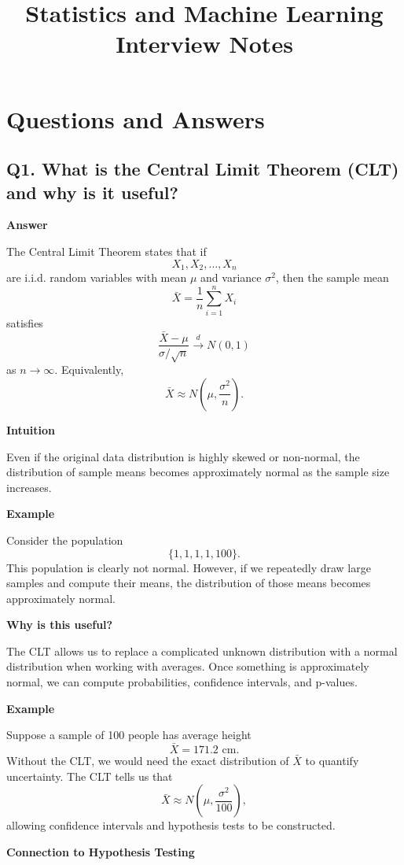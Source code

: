 \documentclass[11pt]{article}
\title{Statistics and Machine Learning Interview Notes}
\author{}
\date{}
\begin{document}
\maketitle

\section{Questions and Answers}

\subsection*{Q1. What is the Central Limit Theorem (CLT) and why is it useful?}

\textbf{Answer}

The Central Limit Theorem states that if
\[
X_1,X_2,\dots,X_n
\]
are i.i.d. random variables with mean $\mu$ and variance $\sigma^2$, then the sample mean
\[
\bar X=\frac{1}{n}\sum_{i=1}^{n}X_i
\]
satisfies
\[
\frac{\bar X-\mu}{\sigma/\sqrt n}
\overset{d}{\longrightarrow}
N(0,1)
\]
as $n\to\infty$. Equivalently,
\[
\bar X \approx N\!\left(\mu,\frac{\sigma^2}{n}\right).
\]

\textbf{Intuition}

Even if the original data distribution is highly skewed or non-normal, the distribution of sample means becomes approximately normal as the sample size increases.

\textbf{Example}

Consider the population
\[
\{1,1,1,1,100\}.
\]
This population is clearly not normal. However, if we repeatedly draw large samples and compute their means, the distribution of those means becomes approximately normal.

\textbf{Why is this useful?}

The CLT allows us to replace a complicated unknown distribution with a normal distribution when working with averages. Once something is approximately normal, we can compute probabilities, confidence intervals, and p-values.

\textbf{Example}

Suppose a sample of 100 people has average height
\[
\bar X = 171.2 \text{ cm}.
\]
Without the CLT, we would need the exact distribution of $\bar X$ to quantify uncertainty. The CLT tells us that
\[
\bar X \approx N\!\left(\mu,\frac{\sigma^2}{100}\right),
\]
allowing confidence intervals and hypothesis tests to be constructed.

\textbf{Connection to Hypothesis Testing}
\end{document}
